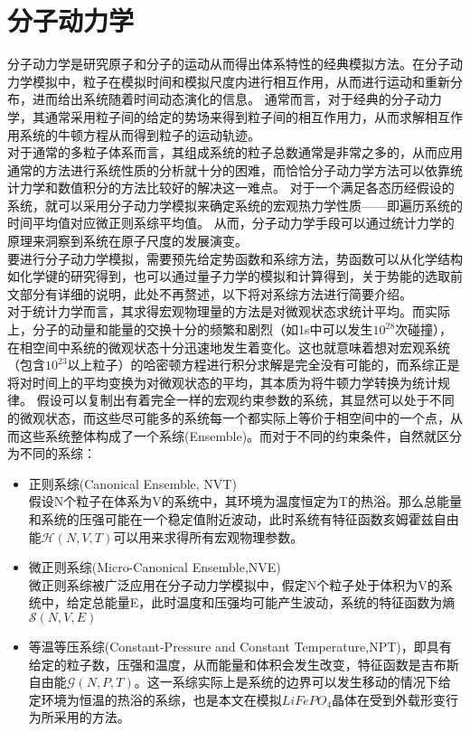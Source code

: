 \section{分子动力学}
分子动力学是研究原子和分子的运动从而得出体系特性的经典模拟方法。在分子动力学模拟中，粒子在模拟时间和模拟尺度内进行相互作用，从而进行运动和重新分布，进而给出系统随着时间动态演化的信息。 通常而言，对于经典的分子动力学，其通常采用粒子间的给定的势场来得到粒子间的相互作用力，从而求解相互作用系统的牛顿方程从而得到粒子的运动轨迹。\\
\indent 对于通常的多粒子体系而言，其组成系统的粒子总数通常是非常之多的，从而应用通常的方法进行系统性质的分析就十分的困难，而恰恰分子动力学方法可以依靠统计力学和数值积分的方法比较好的解决这一难点。 对于一个满足各态历经假设的系统，就可以采用分子动力学模拟来确定系统的宏观热力学性质——即遍历系统的时间平均值对应微正则系综平均值。 从而，分子动力学手段可以通过统计力学的原理来洞察到系统在原子尺度的发展演变。
\\
\indent 要进行分子动力学模拟，需要预先给定势函数和系综方法，势函数可以从化学结构如化学键的研究得到，也可以通过量子力学的模拟和计算得到，关于势能的选取前文部分有详细的说明，此处不再赘述，以下将对系综方法进行简要介绍。\\
\indent 对于统计力学而言，其求得宏观物理量的方法是对微观状态求统计平均。而实际上，分子的动量和能量的交换十分的频繁和剧烈（如1s中可以发生$10^{28}$次碰撞），在相空间中系统的微观状态十分迅速地发生着变化。这也就意味着想对宏观系统（包含$10^{23}$以上粒子）的哈密顿方程进行积分求解是完全没有可能的，而系综正是将对时间上的平均变换为对微观状态的平均，其本质为将牛顿力学转换为统计规律。 假设可以复制出有着完全一样的宏观约束参数的系统，其显然可以处于不同的微观状态，而这些尽可能多的系统每一个都实际上等价于相空间中的一个点，从而这些系统整体构成了一个系综(Ensemble)。而对于不同的约束条件，自然就区分为不同的系综：
\begin{itemize}
	\item 正则系综(Canonical Ensemble, NVT)\\
	假设N个粒子在体系为V的系统中，其环境为温度恒定为T的热浴。那么总能量和系统的压强可能在一个稳定值附近波动，此时系统有特征函数亥姆霍兹自由能$\mathcal{H}(N,V,T)$可以用来求得所有宏观物理参数。
	\item 微正则系综(Micro-Canonical Ensemble,NVE)\\
	微正则系综被广泛应用在分子动力学模拟中，假定N个粒子处于体积为V的系统中，给定总能量E，此时温度和压强均可能产生波动，系统的特征函数为熵$\mathcal{S}(N,V,E)$
	\item 等温等压系综(Constant-Pressure and Constant Temperature,NPT)，即具有给定的粒子数，压强和温度，从而能量和体积会发生改变，特征函数是吉布斯自由能$\mathcal{G}(N,P,T)$。这一系综实际上是系统的边界可以发生移动的情况下给定环境为恒温的热浴的系综，也是本文在模拟$LiFePO_4$晶体在受到外载形变行为所采用的方法。
\end{itemize}
